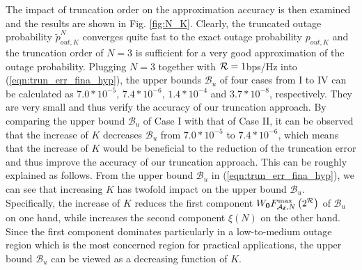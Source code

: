 \documentclass[12pt,onecolumn,draftcls]{IEEEtran}
\newcommand{\bs}{\boldsymbol}
\begin{document}
The impact of truncation order on the approximation accuracy is then examined and the results are shown in Fig. \ref{fig:N_K}. Clearly, the truncated outage probability $\tilde p_{out,K}^N$ converges quite fast to the exact outage probability $p_{out,K}$ and the truncation order of $N=3$ is sufficient for a very good approximation of the outage probability. Plugging $N=3$ together with ${\cal R}=1$bps/Hz into (\ref{eqn:trun_err_fina_hyp}), the upper bounds $\mathcal B_u$ of four cases from I to IV can be calculated as  $7.0*10^{-5}$, $7.4*10^{-6}$, $1.4*10^{-4}$ and $3.7*10^{-8}$, respectively. They are very small and thus verify the accuracy of our truncation approach. By comparing the upper bound $\mathcal B_u$  of Case I with that of Case II, it can be observed that the increase of $K$ decreases $\mathcal B_u$ from $7.0*10^{-5}$ to $7.4*10^{-6}$, which means that the increase of $K$ would be beneficial to the reduction of the truncation error and thus improve the accuracy of our truncation approach. This can be roughly explained as follows. From the upper bound $\mathcal B_u$ in (\ref{eqn:trun_err_fina_hyp}), we can see that increasing $K$ has twofold impact on the upper bound $\mathcal B_u$. Specifically, the increase of $K$ reduces the first component ${W_{\bf{0}}}{{F_{{ {\cal A}_{\bs{\ell}}},N}^{\rm max}}\left( 2^{\cal R} \right)}$ of $\mathcal B_u$ on one hand, while increases the second component $\xi \left( N \right)$ on the other hand. Since the first component dominates particularly in a low-to-medium outage region which is the most concerned region for practical applications, the upper bound $\mathcal B_u$ can be viewed as a decreasing function of $K$.

\end{document}
